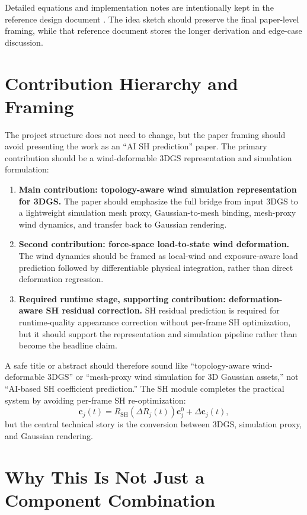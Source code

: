 \documentclass[11pt]{article}
\begin{document}
Detailed equations and implementation notes are intentionally kept in the reference design document . The idea sketch should preserve the final paper-level framing, while that reference document stores the longer derivation and edge-case discussion.

\section{Contribution Hierarchy and Framing}

The project structure does not need to change, but the paper framing should avoid presenting the work as an ``AI SH prediction'' paper. The primary contribution should be a wind-deformable 3DGS representation and simulation formulation:

\begin{enumerate}
  \item \textbf{Main contribution: topology-aware wind simulation representation for 3DGS.}
  The paper should emphasize the full bridge from input 3DGS to a lightweight simulation mesh proxy, Gaussian-to-mesh binding, mesh-proxy wind dynamics, and transfer back to Gaussian rendering.
  \item \textbf{Second contribution: force-space load-to-state wind deformation.}
  The wind dynamics should be framed as local-wind and exposure-aware load prediction followed by differentiable physical integration, rather than direct deformation regression.
  \item \textbf{Required runtime stage, supporting contribution: deformation-aware SH residual correction.}
  SH residual prediction is required for runtime-quality appearance correction without per-frame SH optimization, but it should support the representation and simulation pipeline rather than become the headline claim.
\end{enumerate}

A safe title or abstract should therefore sound like ``topology-aware wind-deformable 3DGS'' or ``mesh-proxy wind simulation for 3D Gaussian assets,'' not ``AI-based SH coefficient prediction.'' The SH module completes the practical system by avoiding per-frame SH re-optimization:
\[
  \mathbf{c}_j(t)
  =
  R_{\mathrm{SH}}(\Delta R_j(t))\mathbf{c}_j^0
  +
  \Delta\mathbf{c}_j(t),
\]
but the central technical story is the conversion between 3DGS, simulation proxy, and Gaussian rendering.

\section{Why This Is Not Just a Component Combination}
\end{document}
